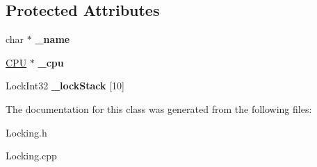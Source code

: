 \subsection*{Protected Attributes}
\begin{DoxyCompactItemize}
\item 
\mbox{\label{class_generic_lock_a699a610f530945caf6ebc9da0738bd3d}} 
char $\ast$ {\bfseries \+\_\+name}
\item 
\mbox{\label{class_generic_lock_aadc93550c44c1f710e3442205bf47c12}} 
\hyperlink{class_c_p_u}{C\+PU} $\ast$ {\bfseries \+\_\+cpu}
\item 
\mbox{\label{class_generic_lock_a616f43d83b5396bf9efded878621764e}} 
Lock\+Int32 {\bfseries \+\_\+lock\+Stack} \mbox{[}10\mbox{]}
\end{DoxyCompactItemize}


The documentation for this class was generated from the following files\+:\begin{DoxyCompactItemize}
\item 
Locking.\+h\item 
Locking.\+cpp\end{DoxyCompactItemize}
